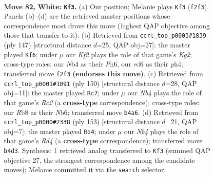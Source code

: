 \documentclass[11pt]{article}
\begin{document}
\clearpage

\begin{figure}[p]\centering
\begin{subfigure}{0.46\textwidth}\centering
\resizebox{\linewidth}{!}{%
\newchessgame
\chessboard[
  setfen={1R6/6p1/3r1pk1/3P3p/1N5P/6P1/5K2/8 w - - 3 82},
  showmover=false,
  pgfstyle=straightmove, color=movearrow, markmove={f2-f3}
]}
\caption{}
\end{subfigure}\hfill
\begin{subfigure}{0.46\textwidth}\centering
\resizebox{\linewidth}{!}{%
\newchessgame
\chessboard[
  setfen={8/5pk1/7p/3R2p1/6PP/4PK2/5P2/r7 b - - 75 74},
  showmover=false,
  pgfstyle=straightmove, color=movearrow, markmove={g7-f6}
]}
\caption{}
\end{subfigure}
\\[4pt]
\begin{subfigure}{0.46\textwidth}\centering
\resizebox{\linewidth}{!}{%
\newchessgame
\chessboard[
  setfen={8/4b1k1/1N3pp1/r6p/3K3P/6P1/P1R2P2/8 w - - 0 76},
  showmover=false,
  pgfstyle=straightmove, color=movearrow, markmove={c2-c7}
]}
\caption{}
\end{subfigure}\hfill
\begin{subfigure}{0.46\textwidth}\centering
\resizebox{\linewidth}{!}{%
\newchessgame
\chessboard[
  setfen={8/5k2/4p3/3r2p1/6Pp/7P/4RPK1/8 b - - 59 77},
  showmover=false,
  pgfstyle=straightmove, color=movearrow, markmove={d5-d4}
]}
\caption{}
\end{subfigure}
\caption{\textbf{Move 82, White: \texttt{Kf3}.} (a) Our position; Melanie plays \texttt{Kf3} (\texttt{f2f3}). Panels (b)--(d) are the retrieved master positions whose correspondence most drove this move (highest QAP objective among those that transfer to it). (b) Retrieved from \texttt{ccrl\_top\_p0003\#1839} (ply 147) [structural distance $d$=25, QAP obj=27]: the master played \texttt{Kf6}; under $\mu$ our \emph{Kf2} plays the role of that game's \emph{Kg2}; cross-type roles: our \emph{N}b4 as their \emph{P}h6, our \emph{r}d6 as their \emph{p}h4; transferred move \texttt{f2f3} \textbf{(endorses this move)}. (c) Retrieved from \texttt{ccrl\_top\_p0001\#1091} (ply 150) [structural distance $d$=28, QAP obj=11]: the master played \texttt{Rc7}; under $\mu$ our \emph{Nb4} plays the role of that game's \emph{Rc2} (a \textbf{cross-type} correspondence); cross-type roles: our \emph{R}b8 as their \emph{N}b6; transferred move \texttt{b4a6}. (d) Retrieved from \texttt{ccrl\_top\_p0000\#2338} (ply 153) [structural distance $d$=21, QAP obj=7]: the master played \texttt{Rd4}; under $\mu$ our \emph{Nb4} plays the role of that game's \emph{Rd4} (a \textbf{cross-type} correspondence); transferred move \texttt{b4d3}. Synthesis: 1 retrieved analog transferred to \texttt{Kf3} (summed QAP objective 27, the strongest correspondence among the candidate moves); Melanie committed it via the \texttt{search} selector.}
\label{fig:thought-m162}
\end{figure}
\end{document}
